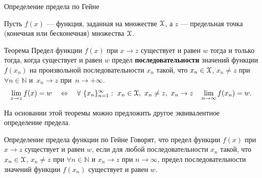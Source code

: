 \documentclass[8pt]{beamer}
\begin{document}

\begin{frame}{Определение предела по Гейне}

Пусть $f(x)$ --- функция, заданная на множестве $\EuScript{X}$, а $z$ --- предельная точка (конечная или бесконечная) множества $\EuScript{X}$. 

\begin{block}{Теорема}
Предел функции $f(x)$ при $x\to z$ существует и равен $w$ тогда и только тогда, когда  существует и равен $w$ предел {\bf последовательности} значений функции $f(x_n)$ на произвольной последовательности $x_n$ такой, что  $x_n\in \EuScript{X}$, $x_n\ne z$ при $\forall n\in\mathbb{N}$ и~$x_n\to z$ при~$n\to+\infty$.
$$
\lim_{x\to z} f(x) = w 
\quad\Leftrightarrow\quad
\forall\ \{x_n\}_{n=1}^\infty:\ x_n\in\EuScript{X},\ x_n\ne z,\ x_n\to z \quad \lim_{n\to\infty} f(x_n)=w.$$
\end{block}
На основании этой теоремы можно предложить другое эквивалентное определение предела.
\begin{block}{Определение предела функции по Гейне}
Говорят, что предел функции $f(x)$ при $x\to z$ существует и равен $w$, если для любой последовательности $x_n$ такой, что $x_n\in \EuScript{X}$, $x_n\ne z$ при $\forall n\in\mathbb{N}$ и $x_n\to z$ при $n\to\infty$, предел последовательности значений функции $f(x_n)$ существует и равен $w$.
\end{block}
\end{frame}
\end{document}
